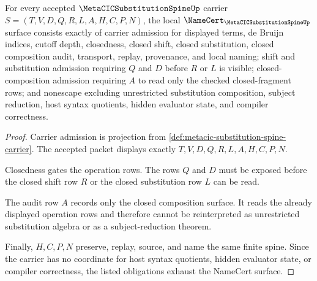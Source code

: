 \begin{theorem}
\label{thm:metacic-substitution-spine-namecert-obligations}
For every accepted $\MetaCICSubstitutionSpineUp$ carrier $S=(T,V,D,Q,R,L,A,H,C,P,N)$, the local $\NameCert_{\MetaCICSubstitutionSpineUp}$ surface consists exactly of carrier admission for displayed terms, de Bruijn indices, cutoff depth, closedness, closed shift, closed substitution, closed composition audit, transport, replay, provenance, and local naming; shift and substitution admission requiring $Q$ and $D$ before $R$ or $L$ is visible; closed-composition admission requiring $A$ to read only the checked closed-fragment rows; and nonescape excluding unrestricted substitution composition, subject reduction, host syntax quotients, hidden evaluator state, and compiler correctness.
\end{theorem}
\begin{proof}
Carrier admission is projection from \autoref{def:metacic-substitution-spine-carrier}. The accepted packet displays exactly $T,V,D,Q,R,L,A,H,C,P,N$.

Closedness gates the operation rows. The rows $Q$ and $D$ must be exposed before the closed shift row $R$ or the closed substitution row $L$ can be read.

The audit row $A$ records only the closed composition surface. It reads the already displayed operation rows and therefore cannot be reinterpreted as unrestricted substitution algebra or as a subject-reduction theorem.

Finally, $H,C,P,N$ preserve, replay, source, and name the same finite spine. Since the carrier has no coordinate for host syntax quotients, hidden evaluator state, or compiler correctness, the listed obligations exhaust the NameCert surface.
\end{proof}

